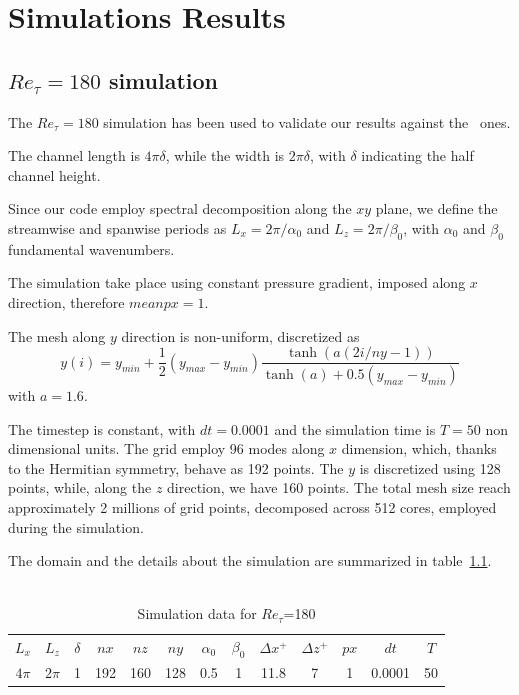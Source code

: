 \chapter{Simulations Results}
\section{$Re_{\tau}=180$ simulation}

The $Re_{\tau}=180$ simulation has been used to validate our results against the~\cite{kim_moin_moser} ones. \par

The channel length is $4\pi \delta$, while the width is $2 \pi \delta$, with $\delta$ indicating the half channel height. \par
Since our code employ spectral decomposition along the $xy$ plane, we define the streamwise and spanwise periods as $L_{x}= 2\pi /\alpha_{0}$ and $L_{z}=2\pi /\beta_{0}$, with $\alpha_{0}$ and $\beta_{0}$ fundamental wavenumbers. \par
The simulation take place using constant pressure gradient, imposed along $x$ direction, therefore $meanpx=1$.\par
The mesh along $y$ direction is non-uniform, discretized as
\begin{equation*}
y(i)=y_{min}+\frac{1}{2}(y_{max}-y_{min})  \frac{\tanh(a(2i/ny-1))}{\tanh(a)+0.5(y_{max}-y_{min})}
\end{equation*}
with $a=1.6$.\par
The timestep is constant, with $dt=0.0001$ and the simulation time is $T=50$ non dimensional units.
The grid employ 96 modes along $x$ dimension, which, thanks to the Hermitian symmetry, behave as 192 points. The $y$ is discretized using 128 points, while, along the $z$ direction, we have 160 points. The total mesh size reach approximately 2 millions of grid points, decomposed across 512 cores, employed during the simulation. 

The domain and the details about the simulation are summarized in table~\ref{table:180}.\\~\par
\begin{table}[h]
\caption{Simulation data for $Re_{\tau}$=180}
\begin{center}
\begin{tabular}{ccccccccccccc}
\toprule
$L_{x}$ & $L_{z}$ & $\delta$ & $nx$ & $nz$ & $ny$ & $\alpha_{0}$ & $\beta_{0}$ & $\Delta x^{+}$ & $\Delta z^{+}$ & $px$ & $dt$ & $T$ \\
$4\pi$ & $2\pi$ & 1 & 192 & 160 & 128 & 0.5 & 1 & 11.8  & 7 & 1 & 0.0001 & 50 \\
\bottomrule
\end{tabular}
\end{center}
\label{table:180}
\end{table}

